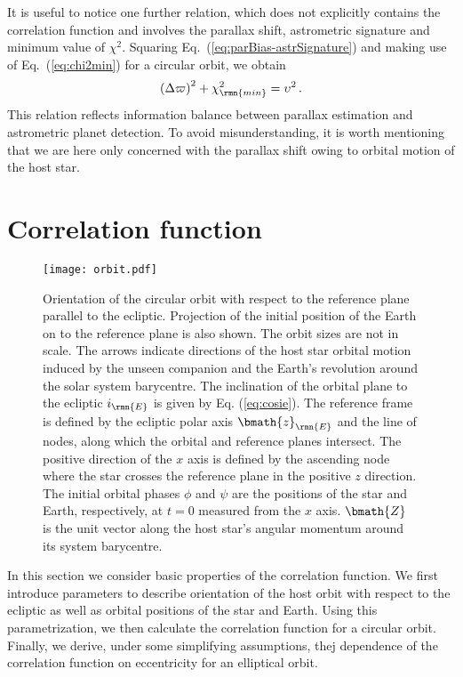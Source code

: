 \documentclass[fleqn,usenatbib,useAMS,usedcolumn]{mnras}
\begin{document}
It is useful to notice one further relation, which does not explicitly contains the correlation function and involves the parallax shift, astrometric signature and minimum value of $\chi^2$. Squaring Eq.~(\ref{eq:parBias-astrSignature}) and making use of Eq.~(\ref{eq:chi2min}) for a circular orbit, we obtain
\begin{equation}
  \left(\Delta\varpi\right)^2+\chi_\rmn{min}^2=\upsilon^2\,.
\end{equation}
This relation reflects information balance between parallax estimation and astrometric planet detection. To avoid misunderstanding, it is worth mentioning that we are here only concerned with the parallax shift owing to orbital motion of the host star.

\section{Correlation function}\label{s:application}

\begin{figure}
  \centering
  \texttt{[image: orbit.pdf]}
 \caption{Orientation of the circular orbit with respect to the reference plane parallel to the ecliptic. Projection of the initial position of the Earth on to the reference plane is also shown. The orbit sizes are not in scale. The arrows indicate directions of the host star orbital motion induced by the unseen companion and the Earth's revolution around the solar system barycentre. The inclination of the orbital plane to the ecliptic $i_\rmn{E}$ is given by Eq. (\ref{eq:cosie}). The reference frame is defined by the ecliptic polar axis $\bmath{z}_\rmn{E}$ and the line of nodes, along which the orbital and reference planes intersect. The positive direction of the $x$ axis is defined by the ascending node where the star crosses the reference plane in the positive $z$ direction. The initial orbital phases $\phi$ and $\psi$ are the positions of the star and Earth, respectively, at $t=0$ measured from the $x$ axis. $\bmath{Z}$ is the unit vector along the host star's angular momentum around its system barycentre.}
  \label{fig:orbit}
\end{figure}

In this section we consider basic properties of the correlation function. We first introduce parameters to describe orientation of the host orbit with respect to the ecliptic as well as orbital positions of the star and Earth. Using this parametrization, we then calculate the correlation function for a circular orbit. Finally, we derive, under some simplifying assumptions, thej dependence of the correlation function on eccentricity for an elliptical orbit.
\end{document}
